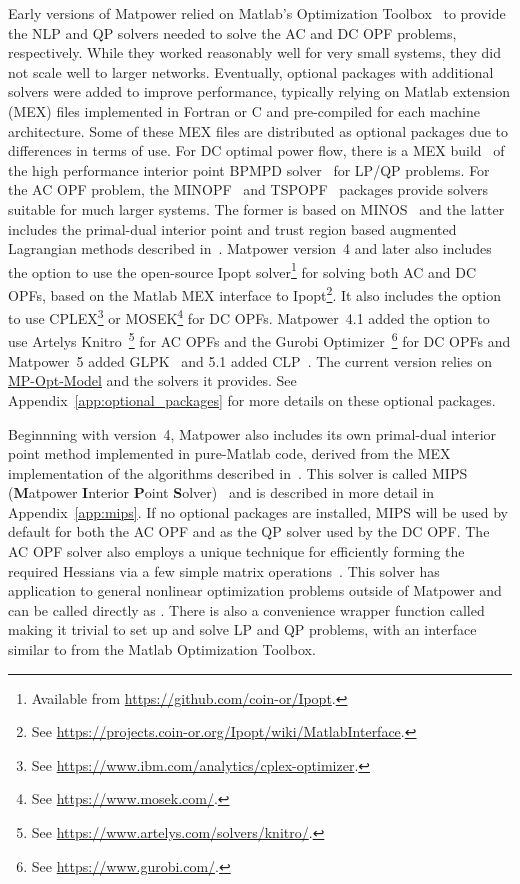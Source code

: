 \documentclass[12pt]{article}
\newcommand{\matlab}[0]{{\sc Matlab}}
\newcommand{\matpower}[0]{{\sc Matpower}}
\newcommand{\mips}[0]{{MIPS}}
\newcommand{\mipsname}[0]{{{\bf M}{\sc atpower} \textbf{I}nterior \textbf{P}oint \textbf{S}olver}}
\newcommand{\mpom}[0]{\mbox{MP-Opt-Model}}
\newcommand{\mpomurl}[0]{https://github.com/MATPOWER/mp-opt-model}
\newcommand{\mpomlink}[0]{\href{\mpomurl}{\mpom{}}}
\newcommand{\ipopt}[0]{{\sc Ipopt}}
\newcommand{\knitro}[0]{{Artelys Knitro}}
\newcommand{\clp}[0]{{CLP}}
\newcommand{\cplex}[0]{{CPLEX}}
\newcommand{\glpk}[0]{{GLPK}}
\newcommand{\gurobi}[0]{{Gurobi}}
\newcommand{\mosek}[0]{{MOSEK}}
\newcommand{\ot}[0]{{Optimization Toolbox}}
\newcommand{\code}[1]{{\relsize{-0.5}{\tt{{#1}}}}}  %
\numberwithin{equation}{section}
\numberwithin{table}{section}
\numberwithin{figure}{section}
\begin{document}
Early versions of \matpower{} relied on \matlab{}'s \ot{}~\cite{ot} to provide the NLP and QP solvers needed to solve the AC and DC OPF problems, respectively. While they worked reasonably well for very small systems, they did not scale well to larger networks. Eventually, optional packages with additional solvers were added to improve performance, typically relying on \matlab{} extension (MEX) files implemented in Fortran or C and pre-compiled for each machine architecture. Some of these MEX files are distributed as optional packages due to differences in terms of use. For DC optimal power flow, there is a MEX build~\cite{bpmpdmex} of the high performance interior point BPMPD solver~\cite{meszaros1996} for LP/QP problems. For the AC OPF problem, the MINOPF~\cite{minopf} and TSPOPF~\cite{tspopf} packages provide solvers suitable for much larger systems. The former is based on MINOS~\cite{murtagh} and the latter includes the primal-dual interior point and trust region based augmented Lagrangian methods described in~\cite{wang2007a}. \matpower{} version~4 and later also includes the option to use the open-source \ipopt{} solver\footnote{Available from \url{https://github.com/coin-or/Ipopt}.} for solving both AC and DC OPFs, based on the \matlab{} MEX interface to \ipopt{}\footnote{See \url{https://projects.coin-or.org/Ipopt/wiki/MatlabInterface}.}. It also includes the option to use \cplex{}\footnote{See \url{https://www.ibm.com/analytics/cplex-optimizer}.} or \mosek{}\footnote{See \url{https://www.mosek.com/}.} for DC OPFs. \matpower{}~4.1 added the option to use \knitro{}~\cite{knitro}\footnote{See \url{https://www.artelys.com/solvers/knitro/}.} for AC OPFs and the \gurobi{} Optimizer~\cite{gurobi}\footnote{See \url{https://www.gurobi.com/}.} for DC OPFs and \matpower{}~5 added \glpk{}~\cite{glpk} and 5.1 added \clp{}~\cite{clp}. The current version relies on \mpomlink{} and the solvers it provides. See Appendix~\ref{app:optional_packages} for more details on these optional packages.

Beginnning with version~4, \matpower{} also includes its own primal-dual interior point method implemented in pure-\matlab{} code, derived from the MEX implementation of the algorithms described in~\cite{wang2007a}. This solver is called \mips{} (\mipsname{})~\cite{mips_manual} and is described in more detail in Appendix~\ref{app:mips}. If no optional packages are installed, \mips{} will be used by default for both the AC OPF and as the QP solver used by the DC OPF. The AC OPF solver also employs a unique technique for efficiently forming the required Hessians via a few simple matrix operations~\cite{zimmerman2010b, sereeter2018a, sereeter2018b}. This solver has application to general nonlinear optimization problems outside of \matpower{} and can be called directly as \code{mips}. There is also a convenience wrapper function called \code{qps\_mips} making it trivial to set up and solve LP and QP problems, with an interface similar to \code{quadprog} from the \matlab{} \ot{}.
\end{document}
